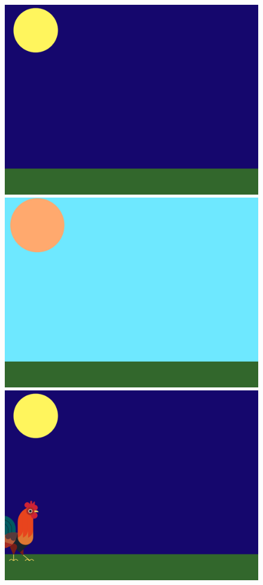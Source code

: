 \documentclass[10pt, a4paper]{article}
\begin{document}
\begin{enumerate}
        \begin{figure}[htb]
            \centering
            \begin{minipage}[t]{.24\textwidth}
                \centering
                \includegraphics[width=.9\textwidth]{37-1.png}
            \end{minipage}
            \begin{minipage}[t]{.24\textwidth}
                \centering
                \includegraphics[width=.9\textwidth]{37-3.png}
            \end{minipage}
            \begin{minipage}[t]{.24\textwidth}
                \centering
                \includegraphics[width=.9\textwidth]{37-4.png}

\end{minipage}
\end{figure}
\end{enumerate}
\end{document}
